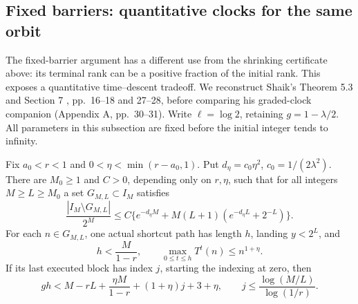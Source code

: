 \subsection{Fixed barriers: quantitative clocks for the same orbit}
\label{subsec:Shaik-fixed-barrier}
The fixed-barrier argument has a different use from the shrinking
certificate above: its terminal rank can be a positive fraction of the
initial rank. This exposes a quantitative time--descent tradeoff.
We reconstruct Shaik's Theorem 5.3 and Section 7
\cite{Shaik2026v324}, pp.~16--18 and 27--28, before comparing
his graded-clock companion (Appendix A, pp.~30--31).
Write \(\ell=\log2\), retaining \(g=1-\lambda/2\).
All parameters in this subsection are fixed before the initial integer
tends to infinity.

\begin{lemma}
\label{lem:Shaik-fixed-barrier}
Fix \(a_0<r<1\) and \(0<\eta<\min(r-a_0,1)\). Put
\(d_\eta=c_0\eta^2\), \(c_0=1/(2\lambda^2)\).
There are \(M_0\ge1\) and \(C>0\), depending only on \(r,\eta\),
such that for all integers \(M\ge L\ge M_0\) a set
\(G_{M,L}\subset I_M\) satisfies
\begin{equation}\label{eq:Shaik-fixed-failure}
 \frac{|I_M\setminus G_{M,L}|}{2^M}
 \le C\{e^{-d_\eta M}
       +M(L+1)(e^{-d_\eta L}+2^{-L})\}.
\end{equation}
For each \(n\in G_{M,L}\), one actual shortcut path has length \(h\),
landing \(y<2^L\), and
\begin{equation}\label{eq:Shaik-fixed-witness}
 h<\frac{M}{1-r},\qquad
 \max_{0\le t\le h}T^t(n)\le n^{1+\eta}.
\end{equation}
If its last executed block has index \(j\), starting the indexing at zero,
then
\begin{equation}\label{eq:Shaik-fixed-clock}
 gh<M-rL+\frac{\eta M}{1-r}+(1+\eta)j+3+\eta,\qquad
 j\le\frac{\log(M/L)}{\log(1/r)}.
\end{equation}
\end{lemma}
